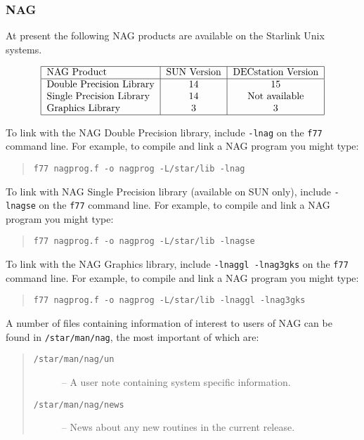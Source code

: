 \subsubsection{NAG}

At present the following NAG products are available on the Starlink Unix
systems.


\begin{table}[htb]\caption{NAG packages available on Unix}\label{NAG libraries}
\[\begin{tabular}{|l|c|c|}
\hline
NAG Product & SUN Version & DECstation Version\\
\hline
Double Precision Library & 14 & 15 \\
Single Precision Library & 14 & Not available \\
Graphics Library         & 3  & 3  \\
\hline
\end{tabular}\]
\end{table}

To link with the NAG Double Precision library, include {\tt -lnag}
on the {\tt f77} command line. For example, to compile and link a NAG program
you might type:
\begin{quote}
{\tt f77 nagprog.f -o nagprog -L/star/lib -lnag }
\end{quote}

To link with NAG Single Precision library (available on SUN only),
include {\tt -lnagse}
on the {\tt f77} command line. For example, to compile and link a NAG program
you might type:
\begin{quote}
{\tt f77 nagprog.f -o nagprog -L/star/lib -lnagse }
\end{quote}

To link with the NAG Graphics library,
include {\tt -lnaggl -lnag3gks}
on the {\tt f77} command line. For example, to compile and link a NAG program
you might type:
\begin{quote}
{\tt f77 nagprog.f -o nagprog -L/star/lib -lnaggl -lnag3gks }
\end{quote}

A number of files containing information of interest to users of NAG can be
found in {\tt /star\-/man\-/nag}, the most important of which are:
\begin{quote}
\begin{description}
\item[\tt /star/man/nag/un] -- A user note containing system specific information.
\item[\tt /star/man/nag/news] -- News about any new routines in the current release.
\end{description}
\end{quote}

